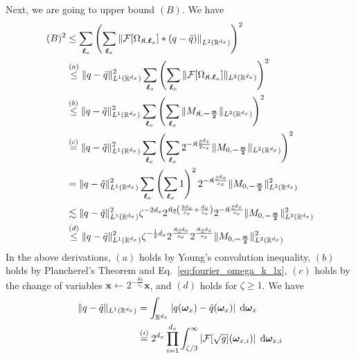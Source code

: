 \documentclass[11pt]{article}
\newcommand{\bx}{\mathbf x}
\newcommand{\bomega}{\boldsymbol{\omega}}
\newcommand{\calF}{\mathcal{F}}
\newcommand{\bl}{{\boldsymbol\ell}}
\newcommand{\0}{\mathbf{0}}
\begin{document}
\begin{appendix}
Next, we are going to upper bound $(B)$.
We have
\begin{align}
    (B)^2 &\leq \sum_{\bl_o}\left(\sum_{\bl_x}\left\|\calF[\Omega_{\mathfrak{K},\bl_x}]\ast (q-\Tilde{q})\right\|_{L^2(\mathbb{R}^{d_x})}\right)^2\nonumber\\
    &\stackrel{(a)}{\leq} \|q - \Tilde{q}\|^2_{L^1(\mathbb{R}^{d_x})} \sum_{\bl_o}\left(\sum_{\bl_x} \|\calF[\Omega_{\mathfrak{K},\bl_x}]\|_{L^2(\mathbb{R}^{d_x})}\right)^2 \nonumber\\
    &\stackrel{(b)}{\leq} \|q - \Tilde{q}\|^2_{L^1(\mathbb{R}^{d_x})} \sum_{\bl_o}\left(\sum_{\bl_x} \|M_{\mathfrak{K},\boldsymbol{-\frac{\mathfrak{m}}{2}}}\|_{L^2(\mathbb{R}^{d_x})}\right)^2 \nonumber\\
    &\stackrel{(c)}{=} \|q - \Tilde{q}\|^2_{L^1(\mathbb{R}^{d_x})} \sum_{\bl_o}\left(\sum_{\bl_x} 2^{-\mathfrak{K}\frac{\underline{s}d_x}{2s_x}} \|M_{0,\boldsymbol{-\frac{\mathfrak{m}}{2}}}\|_{L^2(\mathbb{R}^{d_x})}\right)^2 \nonumber\\
    &=  \|q - \Tilde{q}\|^2_{L^1(\mathbb{R}^{d_x})} \sum_{\bl_o}\left(\sum_{\bl_x}1 \right)^2  2^{-\mathfrak{K}\frac{\underline{s}d_x}{s_x}}\|M_{0,\boldsymbol{-\frac{\mathfrak{m}}{2}}}\|_{L^2(\mathbb{R}^{d_x})}^2\nonumber\\
    &\lesssim  \|q - \Tilde{q}\|^2_{L^1(\mathbb{R}^{d_x})} \zeta^{-2d_x}2^{\mathfrak{K}\underline{s}\left(\frac{2d_x}{s_x} + \frac{d_o}{s_o}\right)} 2^{-\mathfrak{K}\frac{\underline{s}d_x}{s_x}}\|M_{0,\boldsymbol{-\frac{\mathfrak{m}}{2}}}\|_{L^2(\mathbb{R}^{d_x})}^2\nonumber\\
    &\stackrel{(d)}{\leq} \|q - \Tilde{q}\|_{L^1(\mathbb{R}^{d_x})}^2 \zeta^{-\frac{1}{2}d_x} 2^{\frac{\mathfrak{K}\underline{s}d_o}{s_o}}2^{\frac{\mathfrak{K}\underline{s}d_x}{s_x}} \|M_{0,\boldsymbol{-\frac{\mathfrak{m}}{2}}}\|_{L^2(\mathbb{R}^{d_x})}^2 \label{eq: b_upper_bound}
\end{align}
In the above derivations, $(a)$ holds by Young's convolution inequality, $(b)$ holds by Plancherel's Theorem and Eq.~\eqref{eq:fourier_omega_k_lx}, $(c)$ holds by the change of variables $\bx\leftarrow 2^{-\frac{\mathfrak{K}\underline{s}}{s_x}}\bx$, and $(d)$ holds for $\zeta\geq 1$. 
We have
\begin{align}
    \|q - \Tilde{q}\|_{L^1(\mathbb{R}^{d_x})} &= \int_{\mathbb{R}^{d_x}} \left|q(\bomega_x) - \Tilde{q}(\bomega_x)\right| \;\mathrm{d}\bomega_x \nonumber\\
    &\stackrel{(i)}{=} 2^{d_x} \prod_{i=1}^{d_x} \int_{\zeta/3}^{\infty} \left|\calF[\sqrt{g}](\bomega_{x,i}) \right| \;\mathrm{d} \bomega_{x,i}\nonumber \\

\end{align}
\end{appendix}
\end{document}

